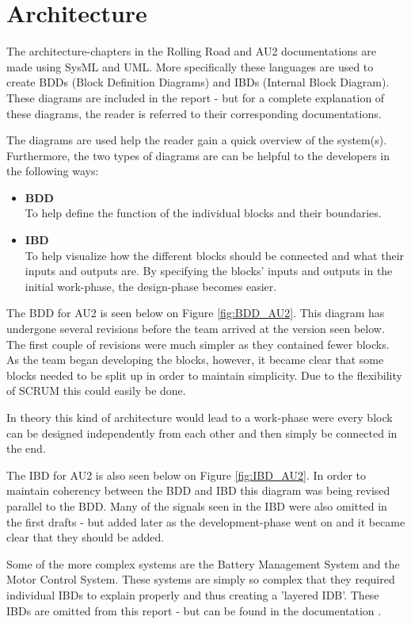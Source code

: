 \chapter{Architecture}
The architecture-chapters in the Rolling Road and AU2 documentations are made using SysML and UML. More specifically these languages are used to create BDDs (Block Definition Diagrams) and IBDs (Internal Block Diagram). These diagrams are included in the report - but for a complete explanation of these diagrams, the reader is referred to their corresponding documentations.

The diagrams are used help the reader gain a quick overview of the system(s). Furthermore, the two types of diagrams are can be helpful to the developers in the following ways:
\begin{itemize}
	\item \textbf{BDD}\\
	To help define the function of the individual blocks and their boundaries. 
	\item \textbf{IBD}\\
	To help visualize how the different blocks should be connected and what their inputs and outputs are. By specifying the blocks' inputs and outputs in the initial work-phase, the design-phase becomes easier.
\end{itemize}

The BDD for AU2 is seen below on Figure \vref{fig:BDD_AU2}. This diagram has undergone several revisions before the team arrived at the version seen below. The first couple of revisions were much simpler as they contained fewer blocks. As the team began developing the blocks, however, it became clear that some blocks needed to be split up in order to maintain simplicity. Due to the flexibility of SCRUM this could easily be done.

In theory this kind of architecture would lead to a work-phase were every block can be designed independently from each other and then simply be connected in the end.

The IBD for AU2 is also seen below on Figure \vref{fig:IBD_AU2}. In order to maintain coherency between the BDD and IBD this diagram was being revised parallel to the BDD. Many of the signals seen in the IBD were also omitted in the first drafts - but added later as the development-phase went on and it became clear that they should be added.

Some of the more complex systems are the Battery Management System and the Motor Control System. These systems are simply so complex that they required individual IBDs to explain properly and thus creating a 'layered IDB'. These IBDs are omitted from this report - but can be found in the documentation .



